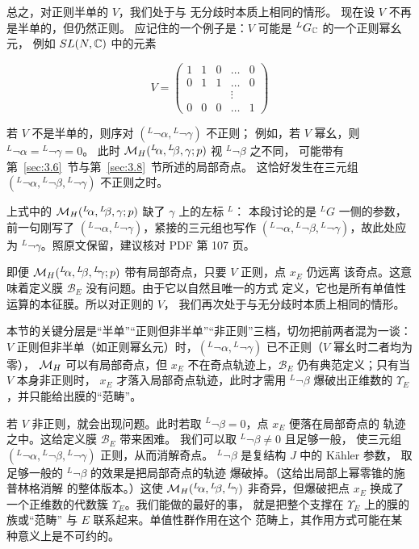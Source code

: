 总之，对正则半单的 $V$，我们处于与
无分歧时本质上相同的情形。
现在设 $V$ 不再是半单的，但仍然正则。
应记住的一个例子是：$V$ 可能是 $^LG_{\mathbb{C}}$ 的一个正则幂幺元，
例如 $SL(N,{\mathbb{C}})$ 中的元素

\setcounter{equation}{19}
\begin{equation}\label{eq:4.20}
  V=\left(\begin{matrix}1& 1& 0&\dots&0\\
                         0&1&1&\dots&0\\
                           & & &\vdots&\\
                           0&0&0&\dots&1\end{matrix}\right)
\end{equation}

若 $V$ 不是半单的，则序对 $({}^L\neg\alpha,{}^L\neg\gamma)$
不正则；
例如，若 $V$ 幂幺，则 ${}^L\neg\alpha={}^L\neg\gamma=0$。
此时 ${{\mathcal{M}}_H}({}^L\negthinspace\alpha,{}^L\negthinspace\beta,\gamma;p)$ 视 ${}^L\neg\beta$ 之不同，
可能带有第~\ref{sec:3.6}~节与第~\ref{sec:3.8}~节所述的局部奇点。
这恰好发生在三元组
$({}^L\neg\alpha,{}^L\neg\beta,{}^L\neg\gamma)$ 不正则之时。

\begin{yizhu}[原文疑误]上式中的 ${{\mathcal{M}}_H}({}^L\negthinspace\alpha,{}^L\negthinspace\beta,\gamma;p)$ 缺了 $\gamma$ 上的左标 $^L$：
本段讨论的是 $^LG$ 一侧的参数，前一句刚写了 $({}^L\neg\alpha,{}^L\neg\gamma)$，紧接的三元组也写作
$({}^L\neg\alpha,{}^L\neg\beta,{}^L\neg\gamma)$，故此处应为 ${}^L\neg\gamma$。照原文保留，建议核对 PDF 第 107 页。\end{yizhu}

即便 ${{\mathcal{M}}_H}({}^L\negthinspace\alpha,{}^L\negthinspace\beta,{}^L\negthinspace\gamma;p)$
带有局部奇点，只要 $V$ 正则，点 $x_E$ 仍远离
该奇点。这意味着定义膜 ${\mathcal B}_E$ 没有问题。由于它以自然且唯一的方式
定义，它也是所有单值性运算的本征膜。所以对正则的 $V$，
我们再次处于与无分歧时本质上相同的情形。

\begin{yizhu}[易错点]本节的关键分层是“半单”“正则但非半单”“非正则”三档，切勿把前两者混为一谈：
$V$ 正则但非半单（如正则幂幺元）时，$({}^L\neg\alpha,{}^L\neg\gamma)$ 已不正则（$V$ 幂幺时二者均为零），
${{\mathcal{M}}_H}$ 可以有局部奇点，但 $x_E$ 不在奇点轨迹上，${\mathcal B}_E$ 仍有典范定义；只有当 $V$ 本身非正则时，
$x_E$ 才落入局部奇点轨迹，此时才需用 ${}^L\neg\beta$ 爆破出正维数的 $\Upsilon_E$，并只能给出膜的“范畴”。\end{yizhu}

若 $V$ 非正则，就会出现问题。此时若取
${}^L\neg\beta=0$，点 $x_E$ 便落在局部奇点的
轨迹之中。这给定义膜 ${\mathcal B}_E$ 带来困难。
我们可以取 ${}^L\neg\beta\not=0$ 且足够一般，
使三元组 $({}^L\neg\alpha,{}^L\neg\beta, {}^L\neg\gamma)$ 正则，从而消解奇点。
${}^L\neg\beta$ 是复结构 $J$ 中的 Kähler 参数，
取足够一般的 ${}^L\neg\beta$ 的效果是把局部奇点的轨迹
爆破掉。（这给出局部上幂零锥的施普林格消解
的整体版本。）这使 ${{\mathcal{M}}_H}({}^L\negthinspace\alpha,{}^L\negthinspace\beta,{}^L\negthinspace\gamma)$
非奇异，但爆破把点 $x_E$ 换成了
一个正维数的代数簇 $\Upsilon_E$。我们能做的最好的事，
就是把整个支撑在 $\Upsilon_E$ 上的膜的族或“范畴”
与 $E$ 联系起来。单值性群作用在这个
范畴上，其作用方式可能在某种意义上是不可约的。

